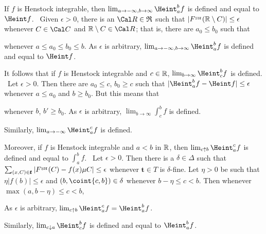 {\medskip

 If $f$ is Henstock integrable, then
$\lim_{a\to-\infty,b\to\infty}\Heint_a^bf$ is defined and equal to
$\Heint f$.   \Prf\ Given
$\epsilon>0$, there is an $\Cal R\in\frak R$ such that
$|F^{_{\text{SH}}}(\Bbb R\setminus C)|\le\epsilon$ whenever $C\in\Cal C$ and
$\Bbb R\setminus C\in\Cal R$;  that is, there are $a_0\le b_0$ such that


\noindent whenever $a\le a_0\le b_0\le b$.
As $\epsilon$ is arbitrary, $\lim_{a\to-\infty,b\to\infty}\Heint_a^bf$
is defined and equal to $\Heint f$.\ \Qed

\medskip

 It follows that if $f$ is Henstock integrable and
$c\in\Bbb R$, $\lim_{b\to\infty}\Heint_c^bf$ is defined.   \Prf\ Let
$\epsilon>0$.   Then there are $a_0\le c$, $b_0\ge c$ such that
$|\Heint_a^bf-\Heint f|\le\epsilon$ whenever $a\le a_0$ and $b\ge b_0$.
But this means that


\noindent whenever $b$, $b'\ge b_0$.   As $\epsilon$ is arbitrary,
$\lim_{b\to\infty}\int_c^bf$ is defined.\ \Qed

Similarly, $\lim_{a\to-\infty}\Heint_a^cf$ is defined.

\medskip

 Moreover, if $f$ is Henstock integrable and
$a<b$ in $\Bbb R$, then $\lim_{c\uparrow b}\Heint_a^cf$ is defined and
equal to $\int_a^bf$.   \Prf\ Let $\epsilon>0$.   Then
there is a $\delta\in\Delta$ such that
$\sum_{(x,C)\in\pmb{t}}|F^{_{\text{SH}}}(C)-f(x)\mu C|\le\epsilon$ whenever
$\pmb{t}\in T$ is $\delta$-fine.   Let $\eta>0$ be such that
$\eta|f(b)|\le\epsilon$ and $(b,\coint{c,b})\in\delta$ whenever
$b-\eta\le c<b$.   Then whenever $\max(a,b-\eta)\le c<b$,


\noindent As $\epsilon$ is arbitrary,
$\lim_{c\uparrow b}\Heint_a^cf=\Heint_a^bf$.\ \Qed

Similarly, $\lim_{c\downarrow a}\Heint_c^bf$ is defined and equal to
$\Heint_a^bf$.

\medskip

}
